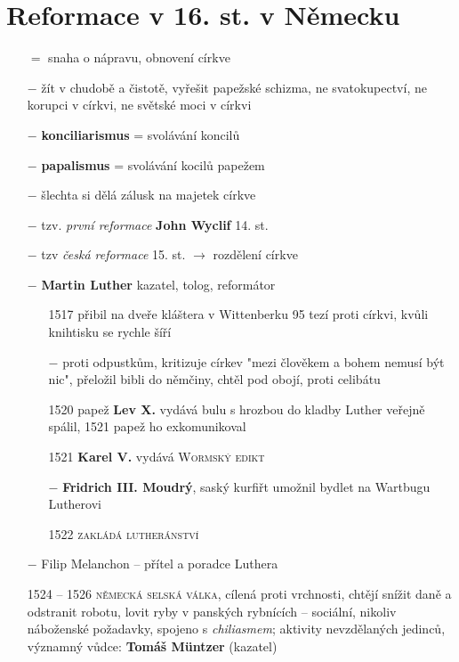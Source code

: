 \documentclass{article}
\begin{document}
\section*{Reformace v 16. st. v Německu}
\begin{itemize}
    \vspace{-0.5em}
    \setlength\itemsep{0.15em}
    \item[$=$] snaha o nápravu, obnovení církve
    \item[$-$] žít v chudobě a čistotě, vyřešit papežské schizma, ne svatokupectví, ne korupci v církvi, ne světské moci v církvi
    \item[$-$] \textbf{konciliarismus} = svolávání koncilů
    \item[$-$] \textbf{papalismus} = svolávání kocilů papežem
    \item[$-$] šlechta si dělá zálusk na majetek církve
    \item[$-$] tzv. \textit{první reformace} \textbf{John Wyclif} 14. st.
    \item[$-$] tzv \textit{česká reformace} 15. st. $\rightarrow$ rozdělení církve
    \item[$-$] \textbf{Martin Luther} kazatel, tolog, reformátor
    \begin{itemize}
        \vspace{-0.5em}
        \setlength\itemsep{0.15em}
        \item[1517] přibil na dveře kláštera v Wittenberku 95 tezí proti církvi, kvůli knihtisku se rychle šíří
        \item[$-$] proti odpustkům, kritizuje církev "mezi člověkem a bohem nemusí být nic", přeložil bibli do němčiny, chtěl pod obojí, proti celibátu
        \item[1520] papež \textbf{Lev X.} vydává bulu s hrozbou do kladby \implies Luther veřejně spálil, 1521 papež ho exkomunikoval
        \item[1521] \textbf{Karel V.} vydává \textsc{Wormský edikt}
        \item[$-$] \textbf{Fridrich III. Moudrý}, saský kurfiřt umožnil bydlet na Wartbugu Lutherovi
        \item[1522] \textsc{zakládá lutheránství}
    \end{itemize}
    \item[$-$] Filip Melanchon -- přítel a poradce Luthera
    \item[1524 -- 1526] \textsc{německá selská válka}, cílená proti vrchnosti, chtějí snížit daně a odstranit robotu, lovit ryby v panských rybnících -- sociální, nikoliv náboženské požadavky, spojeno s \textit{chiliasmem}; aktivity nevzdělaných jedinců, významný vůdce: \textbf{Tomáš Müntzer} (kazatel)

\end{itemize}
\end{document}
